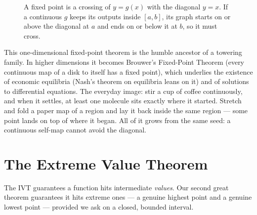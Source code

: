 \begin{figure}[H]
\centering
{}
\caption{A fixed point is a crossing of $y=g(x)$ with the diagonal $y=x$. If a continuous
$g$ keeps its outputs inside $[a,b]$, its graph starts on or above the diagonal at $a$ and
ends on or below it at $b$, so it must cross.}
\label{ch08:fig-fixed}
\end{figure}

\begin{connectionbox}
This one-dimensional fixed-point theorem is the humble ancestor of a towering family. In
higher dimensions it becomes Brouwer's Fixed-Point Theorem (every continuous map of a disk
to itself has a fixed point), which underlies the existence of economic equilibria
(Nash's theorem on equilibria leans on it) and of solutions to differential equations. The
everyday image: stir a cup of coffee continuously, and when it settles, at least one
molecule sits exactly where it started. Stretch and fold a paper map of a region and lay it
back inside the same region --- some point lands on top of where it began. All of it grows
from the same seed: a continuous self-map cannot avoid the diagonal.
\end{connectionbox}

\section{The Extreme Value Theorem}
\label{ch08:evt}

The IVT guarantees a function hits intermediate \emph{values}. Our second great theorem
guarantees it hits extreme ones --- a genuine highest point and a genuine lowest point ---
provided we ask on a closed, bounded interval.

